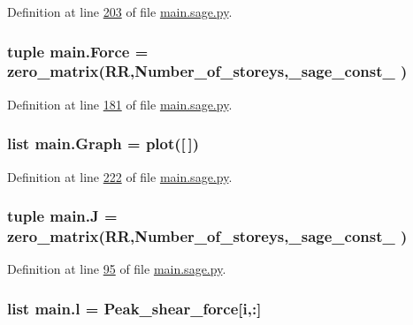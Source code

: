 Definition at line \hyperlink{main_8sage_8py_source_l00203}{203} of file \hyperlink{main_8sage_8py_source}{main.\+sage.\+py}.

\hypertarget{namespacemain_aa91561fad2579200e566fa01f3cbc359}{}
\subsubsection[{Force}]{\setlength{\rightskip}{0pt plus 5cm}tuple main.\+Force = zero\+\_\+matrix(R\+R,Number\+\_\+of\+\_\+storeys,\+\_\+sage\+\_\+const\+\_ )}\label{namespacemain_aa91561fad2579200e566fa01f3cbc359}


Definition at line \hyperlink{main_8sage_8py_source_l00181}{181} of file \hyperlink{main_8sage_8py_source}{main.\+sage.\+py}.

\hypertarget{namespacemain_ad40f6b3437e83a0385177ac65a317b97}{}
\subsubsection[{Graph}]{\setlength{\rightskip}{0pt plus 5cm}list main.\+Graph = plot(\mbox{[}$\,$\mbox{]})}\label{namespacemain_ad40f6b3437e83a0385177ac65a317b97}


Definition at line \hyperlink{main_8sage_8py_source_l00222}{222} of file \hyperlink{main_8sage_8py_source}{main.\+sage.\+py}.

\hypertarget{namespacemain_a00488f5887e168f7781b6fb94dd08518}{}
\subsubsection[{J}]{\setlength{\rightskip}{0pt plus 5cm}tuple main.\+J = zero\+\_\+matrix(R\+R,Number\+\_\+of\+\_\+storeys,\+\_\+sage\+\_\+const\+\_ )}\label{namespacemain_a00488f5887e168f7781b6fb94dd08518}


Definition at line \hyperlink{main_8sage_8py_source_l00095}{95} of file \hyperlink{main_8sage_8py_source}{main.\+sage.\+py}.

\hypertarget{namespacemain_a027916efc284622d928c1d8383917f6d}{}
\subsubsection[{l}]{\setlength{\rightskip}{0pt plus 5cm}list main.\+l = {\bf Peak\+\_\+shear\+\_\+force}\mbox{[}{\bf i},\+:\mbox{]}}\label{namespacemain_a027916efc284622d928c1d8383917f6d}


